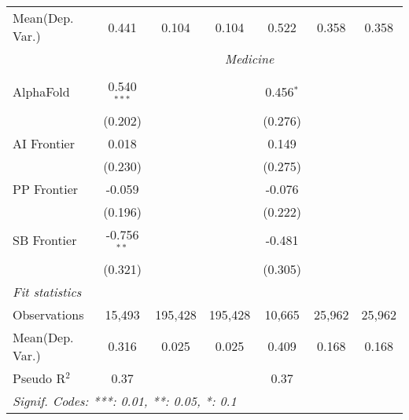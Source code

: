 \begin{tabular}{lcccccc}
Mean(Dep. Var.) & 0.441 & 0.104 & 0.104 & 0.522 & 0.358 & 0.358 \\
 & \multicolumn{6}{c}{\textit{Medicine}} \\ \\
   AlphaFold    & 0.540$^{***}$ &         &         & 0.456$^{*}$ &        &   \\   
                & (0.202)       &         &         & (0.276)     &        &   \\   
   AI Frontier  & 0.018         &         &         & 0.149       &        &   \\   
                & (0.230)       &         &         & (0.275)     &        &   \\   
   PP Frontier  & -0.059        &         &         & -0.076      &        &   \\   
                & (0.196)       &         &         & (0.222)     &        &   \\   
   SB Frontier  & -0.756$^{**}$ &         &         & -0.481      &        &   \\   
                & (0.321)       &         &         & (0.305)     &        &   \\   
   \midrule
   \emph{Fit statistics}\\
   Observations & 15,493        & 195,428 & 195,428 & 10,665      & 25,962 & 25,962\\  
Mean(Dep. Var.) & 0.316 & 0.025 & 0.025 & 0.409 & 0.168 & 0.168 \\
   Pseudo R$^2$ & 0.37          &         &         & 0.37        &        & \\  
   \midrule \midrule
   \multicolumn{7}{l}{\emph{Signif. Codes: ***: 0.01, **: 0.05, *: 0.1}}\\
\end{tabular}
\par\endgroup
